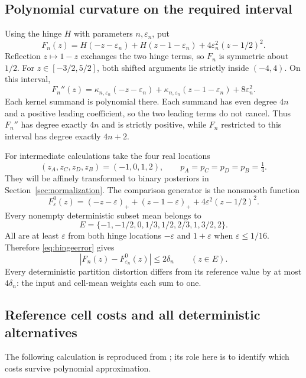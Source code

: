 \documentclass[11pt]{article}
\theoremstyle{definition}\newtheorem{definition}[theorem]{Definition}
\theoremstyle{remark}\newtheorem{remark}[theorem]{Remark}
\begin{document}
\subsection{Polynomial curvature on the required interval}
Using the hinge $H$ with parameters $n,\varepsilon_n$, put
\begin{equation}
F_n(z)=H(-z-\varepsilon_n)+H(z-1-\varepsilon_n)
       +4\varepsilon_n^2(z-1/2)^2.
\label{eq:Fn}
\end{equation}
Reflection $z\mapsto1-z$ exchanges the two hinge terms, so $F_n$ is symmetric about $1/2$. For $z\in[-3/2,5/2]$, both shifted arguments lie strictly inside $(-4,4)$. On this interval,
\begin{equation}
F_n''(z)=\kappa_{n,\varepsilon_n}(-z-\varepsilon_n)
+\kappa_{n,\varepsilon_n}(z-1-\varepsilon_n)+8\varepsilon_n^2.
\label{eq:Fncurvature}
\end{equation}
Each kernel summand is polynomial there. Each summand has even degree $4n$ and a positive leading coefficient, so the two leading terms do not cancel. Thus $F_n''$ has degree exactly $4n$ and is strictly positive, while $F_n$ restricted to this interval has degree exactly $4n+2$.

For intermediate calculations take the four real locations
\[
(z_A,z_C,z_D,z_B)=(-1,0,1,2),\qquad p_A=p_C=p_D=p_B=\tfrac14.
\]
They will be affinely transformed to binary posteriors in Section~\ref{sec:normalization}. The comparison generator is the nonsmooth function
\begin{equation}
F_\varepsilon^0(z)=(-z-\varepsilon)_++(z-1-\varepsilon)_+
+4\varepsilon^2(z-1/2)^2.
\label{eq:reference}
\end{equation}
Every nonempty deterministic subset mean belongs to
\begin{equation}
E=\{-1,-1/2,0,1/3,1/2,2/3,1,3/2,2\}.
\label{eq:means}
\end{equation}
All are at least $\varepsilon$ from both hinge locations $-\varepsilon$ and $1+\varepsilon$ when $\varepsilon\le1/16$. Therefore \eqref{eq:hingeerror} gives
\[
|F_n(z)-F_{\varepsilon_n}^0(z)|\le2\delta_n\qquad(z\in E).
\]
Every deterministic partition distortion differs from its reference value by at most $4\delta_n$: the input and cell-mean weights each sum to one.

\subsection{Reference cell costs and all deterministic alternatives}
\label{sec:gadget}
The following calculation is reproduced from \cite[Lemma 4.2]{huang7}; its role here is to identify which costs survive polynomial approximation.
\end{document}

